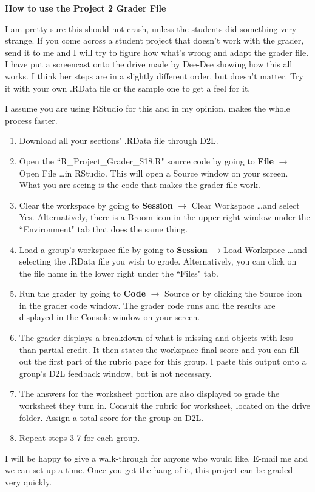 \documentclass{article}
\begin{document}
\thispagestyle{empty}
\begin{center}
\textbf{
{\large How to use the Project 2 Grader File}	
 }
\end{center}

I am pretty sure this should not crash, unless the students did something very strange. If you come across a student project that doesn't work with the grader, send it to me and I will try to figure how what's wrong and adapt the grader file. I have put a screencast onto the drive made by Dee-Dee showing how this all works. I think her steps are in a slightly different order, but doesn't matter. Try it with your own .RData file or the sample one to get a feel for it.

I assume you are using RStudio for this and in my opinion, makes the whole process faster.

\begin{enumerate}

\item Download all your sections' .RData file through D2L.

\item Open the ``R\_Project\_Grader\_S18.R" source code by going to \textbf{File} $\rightarrow$ Open File \ldots in RStudio. This will open a Source window on your screen. What you are seeing is the code that makes the grader file work.

\item Clear the workspace by going to \textbf{Session} $\rightarrow$ Clear Workspace \ldots and select Yes. Alternatively, there is a Broom icon in the upper right window under the ``Environment" tab that does the same thing.

\item Load a group's workspace file by going to \textbf{Session} $\rightarrow$Load Workspace \ldots and selecting the .RData file you wish to grade. Alternatively, you can click on the file name in the lower right under the ``Files" tab.

\item Run the grader by going to \textbf{Code} $\rightarrow$ Source or by clicking the Source icon in the grader code window. The grader code runs and the results are displayed in the Console window on your screen.

\item The grader displays a breakdown of what is missing and objects with less than partial credit. It then states the workspace final score and you can fill out the first part of the rubric page for this group. I paste this output onto a group's D2L feedback window, but is not necessary.

\item The answers for the worksheet portion are also displayed to grade the worksheet they turn in. Consult the rubric for worksheet, located on the drive folder. Assign a total score for the group on D2L.

\item Repeat steps 3-7 for each group.

\end{enumerate}

I will be happy to give a walk-through for anyone who would like. E-mail me and we can set up a time. Once you get the hang of it, this project can be graded very quickly.
\end{document}
